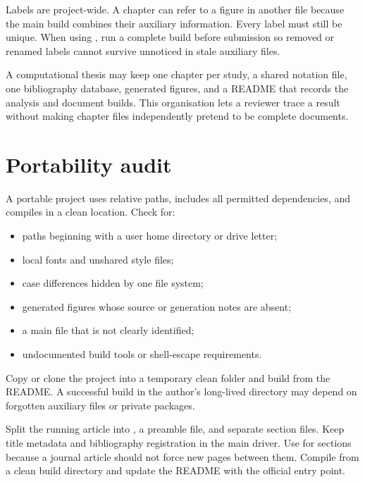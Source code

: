 Labels are project-wide. A chapter can refer to a figure in another file
because the main build combines their auxiliary information. Every label must
still be unique. When using , run a complete build before
submission so removed or renamed labels cannot survive unnoticed in stale
auxiliary files.

\begin{scienceinpractice}
A computational thesis may keep one chapter per study, a shared notation file,
one bibliography database, generated figures, and a README that records the
analysis and document builds. This organisation lets a reviewer trace a result
without making chapter files independently pretend to be complete documents.
\end{scienceinpractice}

\section{Portability audit}

A portable project uses relative paths, includes all permitted dependencies,
and compiles in a clean location. Check for:

\begin{itemize}
  \item paths beginning with a user home directory or drive letter;
  \item local fonts and unshared style files;
  \item case differences hidden by one file system;
  \item generated figures whose source or generation notes are absent;
  \item a main file that is not clearly identified;
  \item undocumented build tools or shell-escape requirements.
\end{itemize}

\begin{goodpractice}
Copy or clone the project into a temporary clean folder and build from the
README. A successful build in the author's long-lived directory may depend on
forgotten auxiliary files or private packages.
\end{goodpractice}

\chapterproject

\begin{miniproject}
Split the running article into , a preamble file, and separate
section files. Keep title metadata and bibliography registration in the main
driver. Use  for sections because a journal article should not force
new pages between them. Compile from a clean build directory and update the
README with the official entry point.
\end{miniproject}

